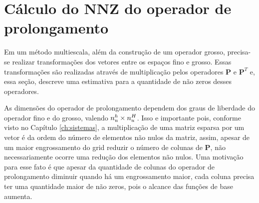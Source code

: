




\section{Cálculo do NNZ do operador de prolongamento}\label{sec:complexProlong}

Em um método multiescala, além da construção de um operador grosso, precisa-se realizar transformações dos vetores entre os espaços fino e grosso. Essas transformações são realizadas através de multiplicação pelos operadores $\mathbf{P}$ e $\mathbf{P}^T$ e, essa seção, descreve uma estimativa para a quantidade de não zeros desses operadores.

As dimensões do operador de prolongamento dependem dos graus de liberdade do operador fino e do  grosso, valendo $n_u^h \times n_u^H$. Isso e importante pois, conforme visto no Capítulo \ref{ch:sistemas}, a multiplicação de uma matriz esparsa por um vetor é da ordem do número de elementos  não nulos da matriz, assim, apesar de um maior engrossamento do grid reduzir o número de colunas de $\mathbf{P}$, não necessariamente ocorre uma redução dos elementos não nulos. Uma motivação para esse fato é que apesar da quantidade de colunas do operador de prolongamento diminuir quando há um engrossamento maior, cada coluna precisa ter uma quantidade maior de não zeros, pois o alcance das funções de base aumenta.


